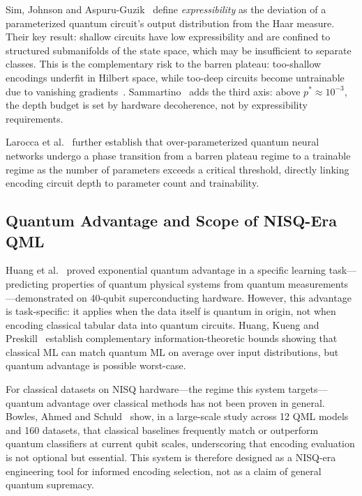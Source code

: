 \documentclass[sigconf,nonacm]{acmart}
\begin{document}
Sim, Johnson and Aspuru-Guzik~\cite{sim2019} define \emph{expressibility} as the
deviation of a parameterized quantum circuit's output distribution from the Haar
measure. Their key result: shallow circuits have low expressibility and are confined
to structured submanifolds of the state space, which may be insufficient to separate
classes. This is the complementary risk to the barren plateau: too-shallow encodings
underfit in Hilbert space, while too-deep circuits become untrainable due to
vanishing gradients~\cite{mcclean2018}. Sammartino~\cite{sammartino2026} adds the
third axis: above $p^{*} \approx 10^{-3}$, the depth budget is set by hardware
decoherence, not by expressibility requirements.

Larocca et al.~\cite{larocca2023} further establish that over-parameterized quantum
neural networks undergo a phase transition from a barren plateau regime to a
trainable regime as the number of parameters exceeds a critical threshold, directly
linking encoding circuit depth to parameter count and trainability.

\subsection{Quantum Advantage and Scope of NISQ-Era QML}

Huang et al.~\cite{huang2022} proved exponential quantum advantage in a specific
learning task---predicting properties of quantum physical systems from quantum
measurements---demonstrated on 40-qubit superconducting hardware. However, this
advantage is task-specific: it applies when the data itself is quantum in origin,
not when encoding classical tabular data into quantum circuits. Huang, Kueng and
Preskill~\cite{huang2021} establish complementary information-theoretic bounds
showing that classical ML can match quantum ML on average over input distributions,
but quantum advantage is possible worst-case.

For classical datasets on NISQ hardware---the regime this system targets---quantum
advantage over classical methods has not been proven in general. Bowles, Ahmed and
Schuld~\cite{bowles2024} show, in a large-scale study across 12 QML models and 160
datasets, that classical baselines frequently match or outperform quantum classifiers
at current qubit scales, underscoring that encoding evaluation is not optional but
essential. This system is therefore designed as a NISQ-era engineering tool for
informed encoding selection, not as a claim of general quantum supremacy.
\end{document}
